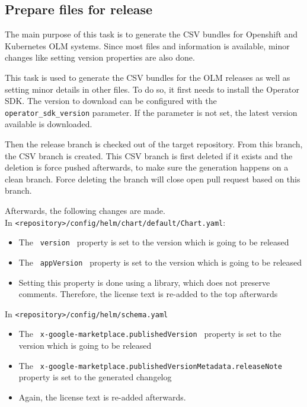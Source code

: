 \subsection{Prepare files for release}\label{subsec:prepare-files-for-release}

The main purpose of this task is to generate the CSV bundles for Openshift and Kubernetes OLM systems.
Since most files and information is available, minor changes like setting version properties are also done.

This task is used to generate the CSV bundles for the OLM releases as well as setting minor details in other files.
To do so, it first needs to install the Operator SDK.
The version to download can be configured with the \verb|operator_sdk_version| parameter.
If the parameter is not set, the latest version available is downloaded.

Then the release branch is checked out of the target repository.
From this branch, the CSV branch is created.
This CSV branch is first deleted if it exists and the deletion is force pushed afterwards, to make sure the generation happens on a clean branch.
Force deleting the branch will close open pull request based on this branch.

Afterwards, the following changes are made. \\
In \verb|<repository>/config/helm/chart/default/Chart.yaml|:
\begin{itemize}
    \item The \verb| version | property is set to the version which is going to be released
    \item The \verb| appVersion | property is set to the version which is going to be released
    \item Setting this property is done using a library, which does not preserve comments.
    Therefore, the license text is re-added to the top afterwards
\end{itemize}

In \verb|<repository>/config/helm/schema.yaml|
\begin{itemize}
    \item The \verb| x-google-marketplace.publishedVersion | property is set to the version which is going to be released
    \item The \verb| x-google-marketplace.publishedVersionMetadata.releaseNote | property is set to the generated changelog
    \item Again, the license text is re-added afterwards.
\end{itemize}

